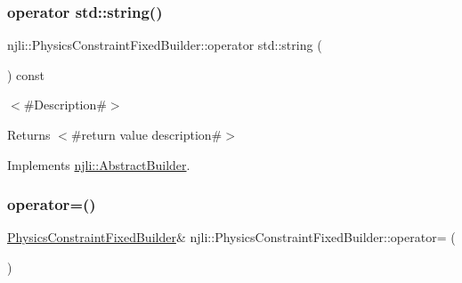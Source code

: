 \subsubsection{\texorpdfstring{operator std\+::string()}{operator std::string()}}
{\footnotesize\ttfamily njli\+::\+Physics\+Constraint\+Fixed\+Builder\+::operator std\+::string (\begin{DoxyParamCaption}{ }\end{DoxyParamCaption}) const\hspace{0.3cm}{\ttfamily [virtual]}}

$<$\#\+Description\#$>$

\begin{DoxyReturn}{Returns}
$<$\#return value description\#$>$ 
\end{DoxyReturn}


Implements \mbox{\hyperlink{classnjli_1_1_abstract_builder_a3e6e553e06d1ca30517ad5fb0bd4d000}{njli\+::\+Abstract\+Builder}}.

\mbox{\label{classnjli_1_1_physics_constraint_fixed_builder_a5390a28f6394c54c1f715a89768c7409}} 
\subsubsection{\texorpdfstring{operator=()}{operator=()}}
{\footnotesize\ttfamily \mbox{\hyperlink{classnjli_1_1_physics_constraint_fixed_builder}{Physics\+Constraint\+Fixed\+Builder}}\& njli\+::\+Physics\+Constraint\+Fixed\+Builder\+::operator= (\begin{DoxyParamCaption}\item[{const \mbox{\hyperlink{classnjli_1_1_physics_constraint_fixed_builder}{Physics\+Constraint\+Fixed\+Builder}} \&}]{ }\end{DoxyParamCaption})\hspace{0.3cm}{\ttfamily [protected]}}

\mbox{\label{classnjli_1_1_physics_constraint_fixed_builder_a31aad1c1c4f1bc4175f58c3e716e6cc9}} 
